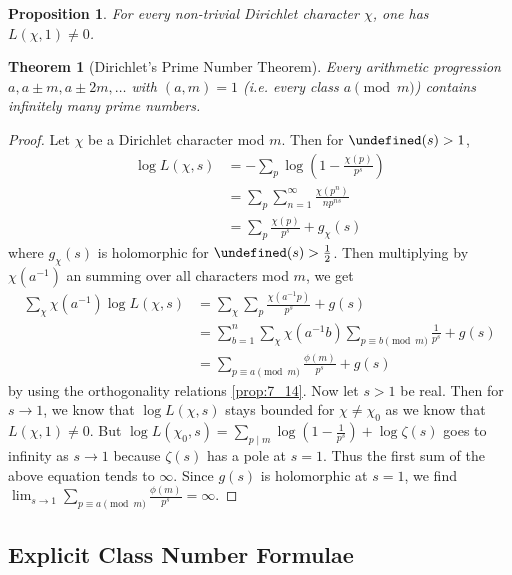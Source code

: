 \documentclass[11pt]{article}
\theoremstyle{definition}
\theoremstyle{plain}
\newtheorem{theorem}[definition]{Theorem}
\newtheorem{proposition}[definition]{Proposition}
\theoremstyle{remark}
\let\Re\undefined
\DeclareMathOperator{\Re}{Re}
\begin{document}
\begin{proposition}\label{prop:7_18}
    For every non-trivial Dirichlet character $\chi$, one has $L(\chi, 1) \neq 0$.
\end{proposition}

\begin{theorem}[Dirichlet's Prime Number Theorem]\label{thm:7_19}
    Every arithmetic progression $a, a \pm m, a \pm 2m, \ldots$ with $(a, m) = 1$ (i.e. every class $a \pmod{m}$) contains infinitely many prime numbers.
\end{theorem}
\begin{proof}
    Let $\chi$ be a Dirichlet character mod $m$. Then for $\Re(s) > 1$,
    \begin{align*}
        \log L(\chi, s)
        &= -\sum_{p}\log\left(1 - \frac{\chi(p)}{p^s}\right)\\
        &= \sum_p \sum_{n=1}^\infty \frac{\chi(p^n)}{n p^{ns}}\\
        &= \sum_p \frac{\chi(p)}{p^s} + g_\chi(s)
    \end{align*}
    where $g_\chi(s)$ is holomorphic for $\Re(s) > \frac{1}{2}$. Then multiplying by $\chi(a^{-1})$ an summing over all characters mod $m$, we get
    \begin{align*}
        \sum_{\chi} \chi(a^{-1}) \log L(\chi, s)
        &= \sum_\chi \sum_p \frac{\chi(a^{-1} p)}{p^s} + g(s)\\
        &= \sum_{b=1}^n \sum_\chi \chi(a^{-1}b)\sum_{p \equiv b \pmod{m}} \frac{1}{p^s} + g(s)\\
        &= \sum_{p \equiv a \pmod{m}} \frac{\phi(m)}{p^s} + g(s)
    \end{align*}
    by using the orthogonality relations \autoref{prop:7_14}. Now let $s > 1$ be real. Then for $s \to 1$, we know that $\log L(\chi, s)$ stays bounded for $\chi \neq \chi_0$ as we know that $L(\chi, 1) \neq 0$. But $\log L(\chi_0, s)  = \sum_{p \mid m} \log \left(1 - \frac{1}{p^s}\right) + \log \zeta(s)$ goes to infinity as $s \to 1$ because $\zeta(s)$ has a pole at $s = 1$. Thus the first sum of the above equation tends to $\infty$. Since $g(s)$ is holomorphic at $s = 1$, we find $\lim_{s \to 1} \sum_{p \equiv a \pmod{m}} \frac{\phi(m)}{p^s} = \infty$.
\end{proof}

\subsection{Explicit Class Number Formulae}
\end{document}
